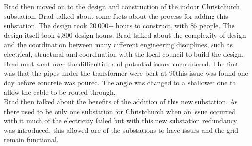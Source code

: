 \documentclass{article}
\begin{document}
Brad then moved on to the design and construction of the indoor Christchurch substation. Brad
talked about some facts about the process for adding this substation. The design took 20,000+
hours to construct, with 86 people. The design itself took 4,800 design hours. Brad talked about
the complexity of design and the coordination between many different engineering disciplines, such
as electrical, structural and coordination with the local council to build the design.\\

Brad next went over the difficulties and potential issues encountered. The first was that the
pipes under the transformer were bent at 90\degree this issue was found one day before concrete
was poured. The angle was changed to a shallower one to allow the cable to be routed through.\\

Brad then talked about the benefits of the addition of this new substation. As there used to be
only one substation for Christchurch when an issue occurred with it much of the electricity failed
but with this new substation redundancy was introduced, this allowed one of the substations to
have issues and the grid remain functional.
\end{document}
